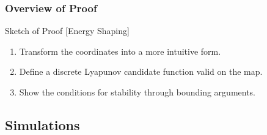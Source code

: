 \begin{frame}[t]
  \frametitle{Overview of Proof}
  \begin{block}{Sketch of Proof [Energy Shaping]}
    \begin{enumerate}
    \item Transform the coordinates into a more intuitive form.
    \item Define a discrete Lyapunov candidate function valid on the \Poincare map.
    \item Show the conditions for stability through bounding arguments.
    \end{enumerate}
  \end{block}
\end{frame}


\subsection{Simulations}

